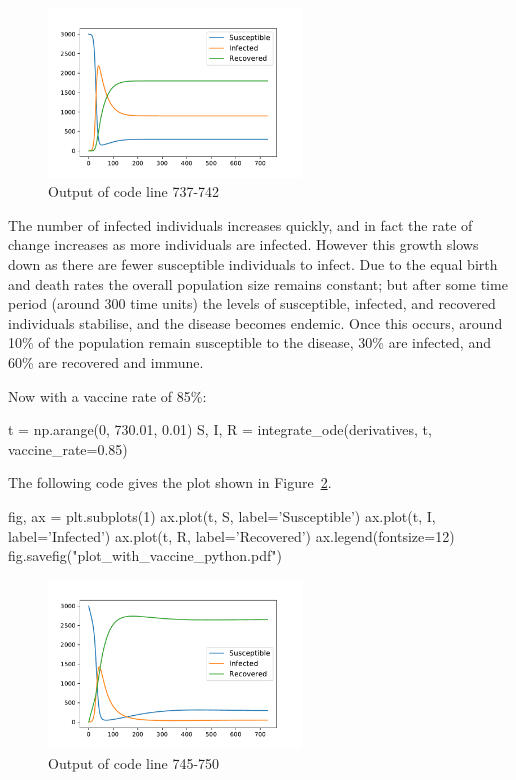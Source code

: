\begin{figure}
\begin{center}
\includegraphics[width=0.6\textwidth]{./assets/plot_no_vaccine_python.pdf}
\end{center}
\caption{Output of code line 737-742}
\label{fig:plot_no_vaccine}
\end{figure}

The number of infected individuals increases quickly, and in fact the rate of
change increases as more individuals are infected. However this growth slows
down as there are fewer susceptible individuals to infect. Due to the equal
birth and death rates the overall population size remains constant; but after
some time period (around 300 time units) the levels of susceptible, infected,
and recovered individuals stabilise, and the disease becomes endemic. Once this
occurs, around 10\% of the population remain susceptible to the disease, 30\%
are infected, and 60\% are recovered and immune.

Now with a vaccine rate of 85\%:

\begin{pyin}
t = np.arange(0, 730.01, 0.01)
S, I, R = integrate_ode(derivatives, t, vaccine_rate=0.85)
\end{pyin}

The following code
gives the plot shown in Figure~\ref{fig:plot_with_vaccine}.

\begin{pyin-no-test}
fig, ax = plt.subplots(1)
ax.plot(t, S, label='Susceptible')
ax.plot(t, I, label='Infected')
ax.plot(t, R, label='Recovered')
ax.legend(fontsize=12)
fig.savefig("plot_with_vaccine_python.pdf")
\end{pyin-no-test}

\begin{figure}
\begin{center}
\includegraphics[width=0.6\textwidth]{./assets/plot_with_vaccine_python.pdf}
\end{center}
\caption{Output of code line 745-750}
\label{fig:plot_with_vaccine}
\end{figure}

